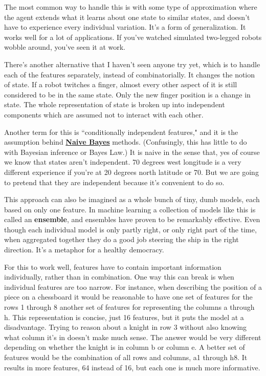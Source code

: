 The most common way to handle this is with some type of approximation
where the agent extends what it learns about one state to similar states,
and doesn't have to experience every individual variation.
It's a form of generalization. It works well for a lot of applications.
If you've watched simulated two-legged robots wobble around,
you've seen it at work.

There's another alternative that I haven't seen anyone try yet,
which is to handle each of the features separately, instead of combinatorially.
It changes the notion of state. If a robot twitches a finger, almost every
other aspect of it is still considered to be in the same state.
Only the new finger position is a change in state. The whole representation
of state is broken up into independent components which are assumed
not to interact with each other.

Another term for this is ``conditionally independent features," and it is
the assumption behind
\textbf{\href{https://en.wikipedia.org/wiki/Naive_Bayes_classifier}{Naive Bayes}}
methods. (Confusingly, this has little to do with Bayesian inference or
Bayes Law.) It is naive in the sense that, yes of course we know that
states aren't independent. 70 degrees west longitude is a very different
experience if you're at 20 degrees north latitude or 70. But we are going
to pretend that they are independent because it's convenient to do so.

This approach can also be imagined as a whole bunch of tiny, dumb models,
each based on only one feature. In machine learning a collection of models
like this is called an \textbf{ensemble}, and ensembles have proven to be
remarkably effective. Even though each individual model is only partly right,
or only right part of the time, when aggregated together they do a good
job steering the ship in the right direction. It's a metaphor
for a healthy democracy.

For this to work well, features have to contain important information
individually, rather than in combination. One way this can break is when
individual features are too narrow. For instance, when describing the
position of a piece on a chessboard it would be reasonable to have one set
of features for the rows 1 through 8 another set of features for representing
the columns a through h. This representation is concise, just 16 features,
but it puts the model at a disadvantage. Trying to reason about a knight
in row 3 without also knowing what column it's in doesn't make much sense.
The answer would be very different depending on whether the knight is in
column b or column e. A better set of features would be the combination
of all rows and columns, a1 through h8. It results in more features,
64 instead of 16, but each one is much more informative.

